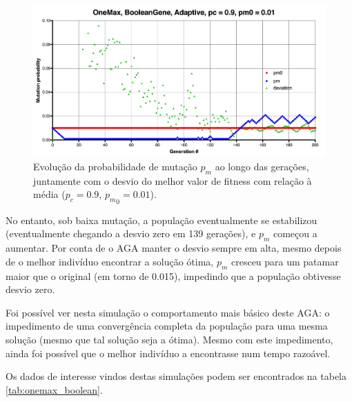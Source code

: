 \begin{figure}[ht!]
    \centering \includegraphics[width=1.0\textwidth]{onemax_boolean_adaptive_pm.jpg}
    \caption{Evolução da probabilidade de mutação $p_m$ ao longo das gerações, juntamente com o desvio do melhor valor de fitness com relação à média ($p_c=0.9$, ${p_m}_0=0.01$).}
    \label{fig:onemax_boolean_adaptive_pm}
\end{figure}

No entanto, sob baixa mutação, a população eventualmente se estabilizou (eventualmente chegando a desvio zero em 139 gerações), e $p_m$ começou a aumentar. Por conta de o AGA manter o desvio sempre em alta, mesmo depois de o melhor indivíduo encontrar a solução ótima, $p_m$ cresceu para um patamar maior que o original (em torno de 0.015), impedindo que a população obtivesse desvio zero.

Foi possível ver nesta simulação o comportamento mais básico deste AGA: o impedimento de uma convergência completa da população para uma mesma solução (mesmo que tal solução seja a ótima). Mesmo com este impedimento, ainda foi possível que o melhor indivíduo a encontrasse num tempo razoável.

Os dados de interesse vindos destas simulações podem ser encontrados na tabela \ref{tab:onemax_boolean}.

